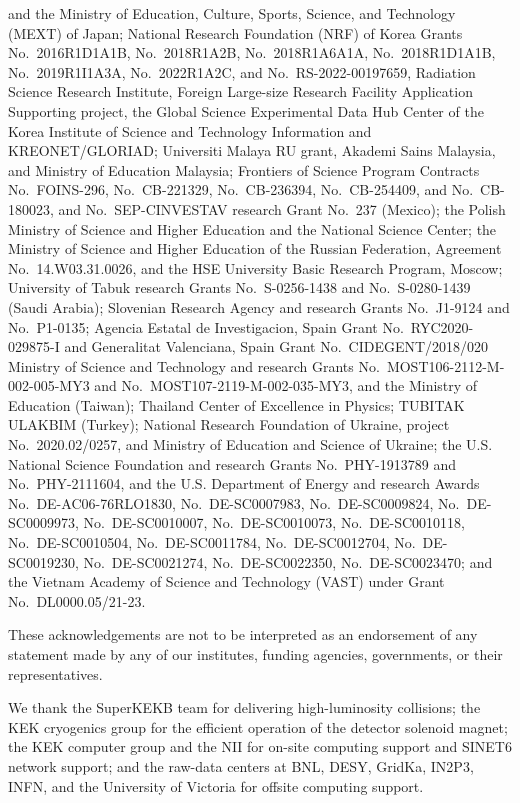 and
the Ministry of Education, Culture, Sports, Science, and Technology (MEXT) of Japan;  
National Research Foundation (NRF) of Korea Grants
No.~2016R1\-D1A1B,
No.~2018R1\-A2B,
No.~2018R1\-A6A1A,
No.~2018R1\-D1A1B,
No.~2019R1\-I1A3A,
No.~2022R1\-A2C,
and
No.~RS-2022-00197659,
Radiation Science Research Institute,
Foreign Large-size Research Facility Application Supporting project,
the Global Science Experimental Data Hub Center of the Korea Institute of Science and Technology Information
and
KREONET/GLORIAD;
Universiti Malaya RU grant, Akademi Sains Malaysia, and Ministry of Education Malaysia;
Frontiers of Science Program Contracts
No.~FOINS-296,
No.~CB-221329,
No.~CB-236394,
No.~CB-254409,
and
No.~CB-180023, and No.~SEP-CINVESTAV research Grant No.~237 (Mexico);
the Polish Ministry of Science and Higher Education and the National Science Center;
the Ministry of Science and Higher Education of the Russian Federation,
Agreement No.~14.W03.31.0026, and
the HSE University Basic Research Program, Moscow;
University of Tabuk research Grants
No.~S-0256-1438 and No.~S-0280-1439 (Saudi Arabia);
Slovenian Research Agency and research Grants
No.~J1-9124
and
No.~P1-0135;
Agencia Estatal de Investigacion, Spain
Grant No.~RYC2020-029875-I
and
Generalitat Valenciana, Spain
Grant No.~CIDEGENT/2018/020
Ministry of Science and Technology and research Grants
No.~MOST106-2112-M-002-005-MY3
and
No.~MOST107-2119-M-002-035-MY3,
and the Ministry of Education (Taiwan);
Thailand Center of Excellence in Physics;
TUBITAK ULAKBIM (Turkey);
National Research Foundation of Ukraine, project No.~2020.02/0257,
and
Ministry of Education and Science of Ukraine;
the U.S. National Science Foundation and research Grants
No.~PHY-1913789 %
and
No.~PHY-2111604, %
and the U.S. Department of Energy and research Awards
No.~DE-AC06-76RLO1830, %
No.~DE-SC0007983, %
No.~DE-SC0009824, %
No.~DE-SC0009973, %
No.~DE-SC0010007, %
No.~DE-SC0010073, %
No.~DE-SC0010118, %
No.~DE-SC0010504, %
No.~DE-SC0011784, %
No.~DE-SC0012704, %
No.~DE-SC0019230, %
No.~DE-SC0021274, %
No.~DE-SC0022350, %
No.~DE-SC0023470; %
and
the Vietnam Academy of Science and Technology (VAST) under Grant No.~DL0000.05/21-23.

These acknowledgements are not to be interpreted as an endorsement of any statement made
by any of our institutes, funding agencies, governments, or their representatives.

We thank the SuperKEKB team for delivering high-luminosity collisions;
the KEK cryogenics group for the efficient operation of the detector solenoid magnet;
the KEK computer group and the NII for on-site computing support and SINET6 network support;
and the raw-data centers at BNL, DESY, GridKa, IN2P3, INFN, and the University of Victoria for offsite computing support.

